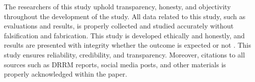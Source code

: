 \begin{description}[style=nextline,leftmargin=0pt]
	\item[Research Integrity.] The researchers of this study uphold transparency,
	honesty, and objectivity throughout the development of the study. All data
	related to this study, such as evaluations and results, is properly
	collected and studied accurately without falsification and fabrication. This
	study is developed ethically and honestly, and results are presented
	with integrity whether the outcome is expected or not \parencite{belmont1979}.
	This study ensures reliability, credibility, and transparency. Moreover,
	citations to all sources such as DRRM reports, social media posts, and other
	materials is properly acknowledged within the paper.
\end{description}